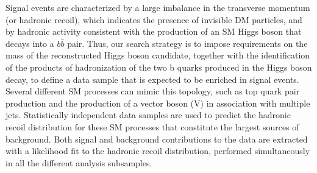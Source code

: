 


Signal events are characterized by a large imbalance in the transverse
momentum (or hadronic recoil), which indicates the presence of invisible
DM particles, and by hadronic activity consistent with the production
of an SM Higgs boson that decays into a $b\bar{b}$ pair. Thus, our search
strategy is to impose requirements on the mass of the reconstructed
Higgs boson candidate, together with the identification of the
products of hadronization of the two b quarks produced in the Higgs
boson decay, to define a data sample that is expected to be enriched
in signal events. Several different SM processes can mimic this topology, such as top quark pair production and the production of a vector boson (V) in association with multiple jets. Statistically independent data samples are used to predict the hadronic recoil distribution for these SM processes that constitute the largest sources of background.
Both signal and background contributions to the data are extracted with a likelihood fit to the hadronic recoil distribution, performed simultaneously in all the different analysis subsamples.
